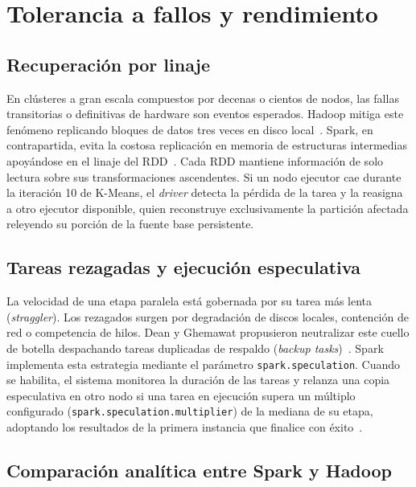 \documentclass[conference,a4paper]{IEEEtran}
\begin{document}
\section{Tolerancia a fallos y rendimiento}
\label{sec:fallos}

\subsection{Recuperación por linaje}

En clústeres a gran escala compuestos por decenas o cientos de nodos, las fallas transitorias o definitivas de hardware son eventos esperados. Hadoop mitiga este fenómeno replicando bloques de datos tres veces en disco local~\cite{shvachko2010hdfs}. Spark, en contrapartida, evita la costosa replicación en memoria de estructuras intermedias apoyándose en el linaje del RDD~\cite{zaharia2012rdd}. Cada RDD mantiene información de solo lectura sobre sus transformaciones ascendentes. Si un nodo ejecutor cae durante la iteración 10 de K-Means, el \textit{driver} detecta la pérdida de la tarea y la reasigna a otro ejecutor disponible, quien reconstruye exclusivamente la partición afectada releyendo su porción de la fuente base persistente.

\subsection{Tareas rezagadas y ejecución especulativa}

La velocidad de una etapa paralela está gobernada por su tarea más lenta (\textit{straggler}). Los rezagados surgen por degradación de discos locales, contención de red o competencia de hilos. Dean y Ghemawat propusieron neutralizar este cuello de botella despachando tareas duplicadas de respaldo (\textit{backup tasks})~\cite{dean2004mapreduce}. Spark implementa esta estrategia mediante el parámetro \texttt{spark.speculation}. Cuando se habilita, el sistema monitorea la duración de las tareas y relanza una copia especulativa en otro nodo si una tarea en ejecución supera un múltiplo configurado (\texttt{spark.speculation.multiplier}) de la mediana de su etapa, adoptando los resultados de la primera instancia que finalice con éxito~\cite{spark-config}.

\subsection{Comparación analítica entre Spark y Hadoop}
\end{document}
